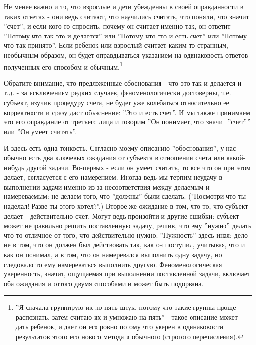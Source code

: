 \documentclass[12pt]{book}
\begin{document}
Не менее важно и то, что взрослые и дети убежденны в своей оправданности в таких ответах - они ведь считают, что научились считать, что поняли, что значит ''счет'', и если кого-то спросить, почему он считает именно так, он ответит ''Потому что так это и делается'' или ''Потому что это и есть счет'' или ''Потому что так принято''. Если ребенок или взрослый считает каким-то странным, необычным образом, он будет оправдываться указанием на одинаковость ответов полученных его способом и обычным.\footnote{''Я сначала группирую их по пять штук, потому что такие группы проще распознать, затем считаю их и умножаю на пять'' - такое описание может дать ребенок, и дает он его ровно потому что уверен в одинаковости результатов этого его нового метода и обычного (строгого перечисления).}

Обратите внимание, что предложенные обоснования - что это так и делается и т.д. - за исключением редких случаев, феноменологически достоверны, т.е. субъект, изучив процедуру счета, не будет уже колебаться относительно ее корректности и сразу даст объяснение: ''Это и есть счет''. И мы также принимаем это его оправдание от третьего лица и говорим ''Он понимает, что значит ''счет'''' или ''Он умеет считать''.

И здесь есть одна тонкость. Согласно моему описанию ''обоснования'', у нас обычно есть два ключевых ожидания от субъекта в отношении счета или какой-нибудь другой задачи. Во-первых - если он умеет считать, то все что он при этом делает, согласуется с его намерением. Иногда ведь мы терпим неудачу в выполнении задачи именно из-за несоответствия между делаемым и намереваемым: не делаем того, что ''должны'' были сделать. (''Посмотри что ты наделал! Разве ты этого хотел?''.) Второе же ожидание в том, что то, что субъект делает - действительно счет. Могут ведь произойти и другие ошибки: субъект может неправильно решить поставленную задачу, решив, что ему ''нужно'' делать что-то отличное от того, что действительно нужно. ''Нужность'' здесь иная: дело не в том, что он должен был действовать так, как он поступил, учитывая, что и как он понимал, а в том, что он намеревался выполнить одну задачу, но следовало то ему намереваться выполнить другую. Феноменологическая уверенность, значит, ощущаемая при выполнении поставленной задачи, включает оба ожидания и оттого двумя способами и может быть подорвана.
\end{document}
